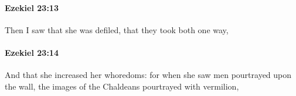 		\paragraph{Ezekiel 23:13} %
			\label{EZEKIEL-23-13}

			Then I saw that she was defiled, that they took both one way,


		\paragraph{Ezekiel 23:14} %
			\label{EZEKIEL-23-14}

			And that she increased her whoredoms: for when she saw men pourtrayed upon the wall, the images of the Chaldeans pourtrayed with vermilion,



